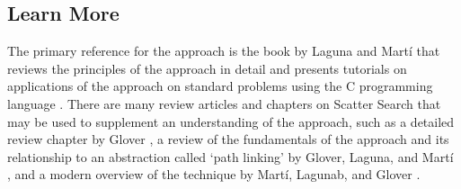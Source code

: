 \subsection{Learn More}
The primary reference for the approach is the book by Laguna and Mart\'i that reviews the principles of the approach in detail and presents tutorials on applications of the approach on standard problems using the C programming language \cite{Laguna2003}.
There are many review articles and chapters on Scatter Search that may be used to supplement an understanding of the approach, such as a detailed review chapter by Glover \cite{Glover1999}, a review of the fundamentals of the approach and its relationship to an abstraction called `path linking' by Glover, Laguna, and Mart\'i \cite{Glover2000}, and a modern overview of the technique by Mart\'i, Lagunab, and Glover \cite{Martia2006}.


